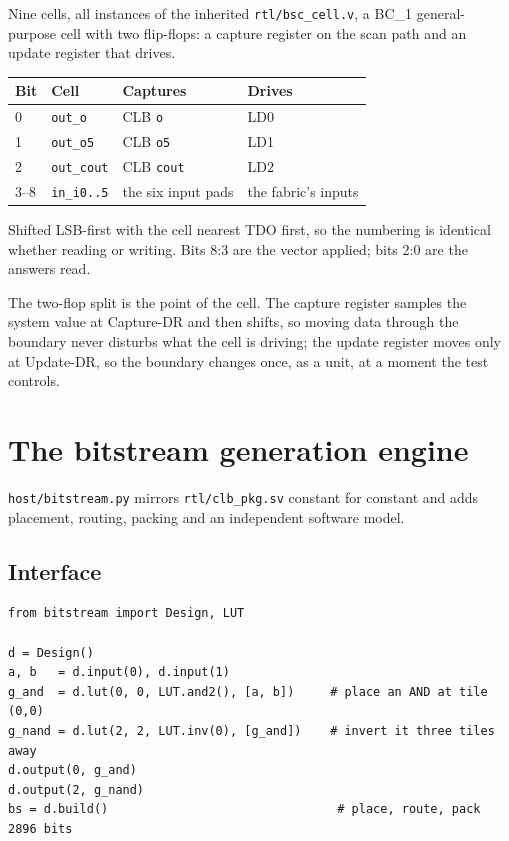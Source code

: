 \documentclass[11pt,a4paper]{article}
\newcommand{\file}[1]{\texttt{#1}}
\newcommand{\sig}[1]{\texttt{#1}}
\begin{document}
Nine cells, all instances of the inherited \file{rtl/bsc\_cell.v}, a BC\_1
general-purpose cell with two flip-flops: a capture register on the scan path
and an update register that drives.

\begin{center}
\begin{tabular}{llll}
\toprule
\textbf{Bit} & \textbf{Cell} & \textbf{Captures} & \textbf{Drives} \\
\midrule
0   & \texttt{out\_o}    & CLB \sig{o}         & LD0 \\
1   & \texttt{out\_o5}   & CLB \sig{o5}        & LD1 \\
2   & \texttt{out\_cout} & CLB \sig{cout}      & LD2 \\
3--8& \texttt{in\_i0..5} & the six input pads  & the fabric's inputs \\
\bottomrule
\end{tabular}
\end{center}

Shifted LSB-first with the cell nearest TDO first, so the numbering is identical
whether reading or writing. Bits 8:3 are the vector applied; bits 2:0 are the
answers read.

The two-flop split is the point of the cell. The capture register samples the
system value at Capture-DR and then shifts, so moving data through the boundary
never disturbs what the cell is driving; the update register moves only at
Update-DR, so the boundary changes once, as a unit, at a moment the test
controls.

\section{The bitstream generation engine}

\file{host/bitstream.py} mirrors \file{rtl/clb\_pkg.sv} constant for constant
and adds placement, routing, packing and an independent software model.

\subsection{Interface}

\begin{lstlisting}[style=py]
from bitstream import Design, LUT

d = Design()
a, b   = d.input(0), d.input(1)
g_and  = d.lut(0, 0, LUT.and2(), [a, b])     # place an AND at tile (0,0)
g_nand = d.lut(2, 2, LUT.inv(0), [g_and])    # invert it three tiles away
d.output(0, g_and)
d.output(2, g_nand)
bs = d.build()                                # place, route, pack 2896 bits
\end{lstlisting}
\end{document}
